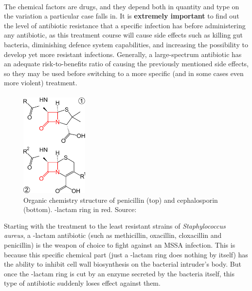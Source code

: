 \paragraph{} The chemical factors are drugs, and they depend both in quantity and type on the variation a particular case falls in. It is \textbf{extremely important} to find out the level of antibiotic resistance that a specific infection has before administering any antibiotic, as this treatment course will cause side effects such as killing gut bacteria, diminishing defence system capabilities, and increasing the possibility to develop yet more resistant infections. Generally, a large-spectrum antibiotic has an adequate risk-to-benefits ratio of causing the previously mentioned side effects, so they may be used before switching to a more specific (and in some cases even more violent) treatment.
\paragraph{}\begin{figure}\begin{center}\includegraphics[width=0.30\textwidth]{assets/beta-lactam.png}\end{center}\caption{Organic chemistry structure of penicillin (top) and cephalosporin (bottom). \beta-lactam ring in red. Source: \cite{FileBetalactamAntibiotics2007}}\vspace{-0.30\linewidth}\end{figure}Starting with the treatment to the least resistant strains of \emph{Staphylococcus aureus}, a \beta-lactam antibiotic (such as methicillin, oxacillin, cloxacillin and penicillin) is the weapon of choice to fight against an MSSA infection. This is because this specific chemical part (just a \beta-lactam ring does nothing by itself) has the ability to inhibit cell wall biosynthesis on the bacterial intruder's body. But once the \beta-lactam ring is cut by an enzyme secreted by the bacteria itself, this type of antibiotic suddenly loses effect against them.
